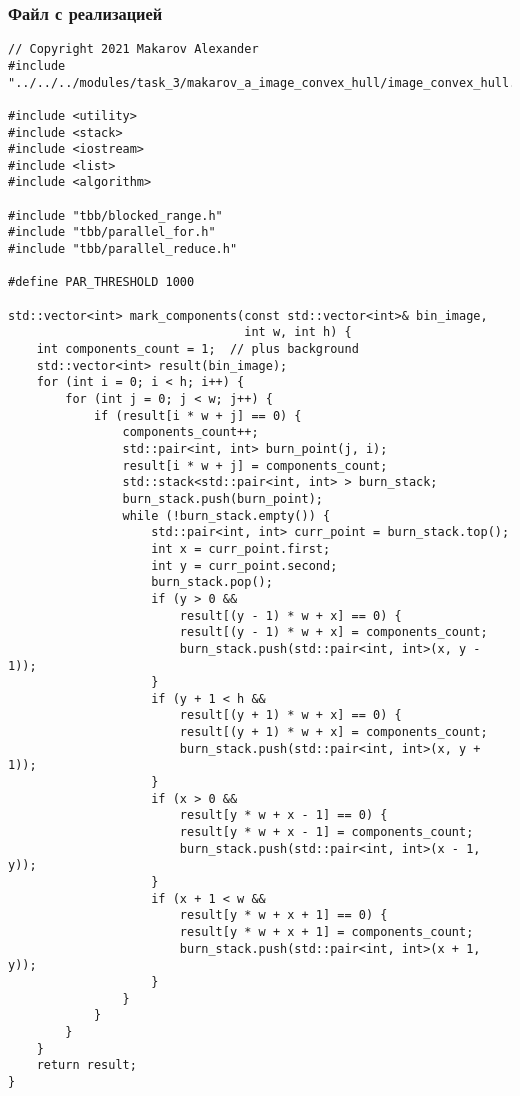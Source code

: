 \documentclass{report}
\begin{document}
\subsubsection{Файл с реализацией}
\begin{lstlisting}
// Copyright 2021 Makarov Alexander
#include "../../../modules/task_3/makarov_a_image_convex_hull/image_convex_hull.h"

#include <utility>
#include <stack>
#include <iostream>
#include <list>
#include <algorithm>

#include "tbb/blocked_range.h"
#include "tbb/parallel_for.h"
#include "tbb/parallel_reduce.h"

#define PAR_THRESHOLD 1000

std::vector<int> mark_components(const std::vector<int>& bin_image,
                                 int w, int h) {
    int components_count = 1;  // plus background
    std::vector<int> result(bin_image);
    for (int i = 0; i < h; i++) {
        for (int j = 0; j < w; j++) {
            if (result[i * w + j] == 0) {
                components_count++;
                std::pair<int, int> burn_point(j, i);
                result[i * w + j] = components_count;
                std::stack<std::pair<int, int> > burn_stack;
                burn_stack.push(burn_point);
                while (!burn_stack.empty()) {
                    std::pair<int, int> curr_point = burn_stack.top();
                    int x = curr_point.first;
                    int y = curr_point.second;
                    burn_stack.pop();
                    if (y > 0 &&
                        result[(y - 1) * w + x] == 0) {
                        result[(y - 1) * w + x] = components_count;
                        burn_stack.push(std::pair<int, int>(x, y - 1));
                    }
                    if (y + 1 < h &&
                        result[(y + 1) * w + x] == 0) {
                        result[(y + 1) * w + x] = components_count;
                        burn_stack.push(std::pair<int, int>(x, y + 1));
                    }
                    if (x > 0 &&
                        result[y * w + x - 1] == 0) {
                        result[y * w + x - 1] = components_count;
                        burn_stack.push(std::pair<int, int>(x - 1, y));
                    }
                    if (x + 1 < w &&
                        result[y * w + x + 1] == 0) {
                        result[y * w + x + 1] = components_count;
                        burn_stack.push(std::pair<int, int>(x + 1, y));
                    }
                }
            }
        }
    }
    return result;
}


\end{lstlisting}
\end{document}
